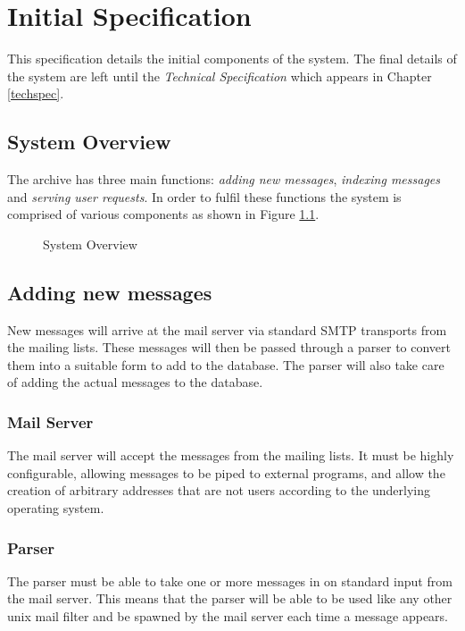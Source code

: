 
\chapter{Initial Specification}
This specification details the initial components of the system.  The
final details of the system are left until the \emph{Technical
Specification} which appears in Chapter \ref{techspec}.

\section{System Overview}
The archive has three main functions: \emph{adding new messages},
\emph{indexing messages} and \emph{serving user requests}.  In order to
fulfil these functions the system is comprised of various components as
shown in Figure \ref{fig:overview}.

\begin{figure}[!ht]
  \begin{center}
  \end{center}
  \caption{System Overview}
  \label{fig:overview}
\end{figure}


\section{Adding new messages} 
New messages will arrive at the mail server via standard SMTP transports
from the mailing lists.  These messages will then be passed through a
parser to convert them into a suitable form to add to the database.  The
parser will also take care of adding the actual messages to the database.

\subsection{Mail Server}
The mail server will accept the messages from the mailing lists.  It must
be highly configurable, allowing messages to be piped to external
programs, and allow the creation of arbitrary addresses that are not users
according to the underlying operating system.

\subsection{Parser}
The parser must be able to take one or more messages in on standard input
from the mail server.  This means that the parser will be able to be used
like any other unix mail filter and be spawned by the mail server each
time a message appears.

